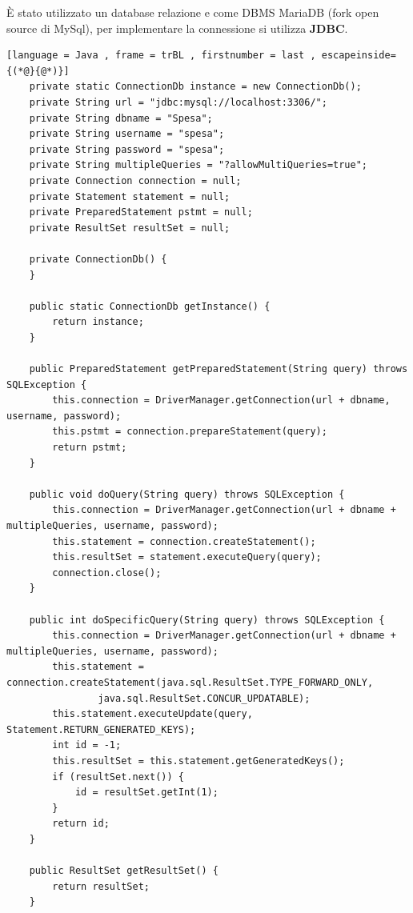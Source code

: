 \documentclass{article}
\begin{document}
\noindent \`E stato utilizzato un database relazione e come DBMS MariaDB (fork open source di MySql),
per implementare la connessione si utilizza \textbf{JDBC}.
\newpage
\begin{lstlisting}[language = Java , frame = trBL , firstnumber = last , escapeinside={(*@}{@*)}]
    private static ConnectionDb instance = new ConnectionDb();
    private String url = "jdbc:mysql://localhost:3306/";
    private String dbname = "Spesa";
    private String username = "spesa";
    private String password = "spesa";
    private String multipleQueries = "?allowMultiQueries=true";
    private Connection connection = null;
    private Statement statement = null;
    private PreparedStatement pstmt = null;
    private ResultSet resultSet = null;

    private ConnectionDb() {
    }

    public static ConnectionDb getInstance() {
        return instance;
    }

    public PreparedStatement getPreparedStatement(String query) throws SQLException {
        this.connection = DriverManager.getConnection(url + dbname, username, password);
        this.pstmt = connection.prepareStatement(query);
        return pstmt;
    }

    public void doQuery(String query) throws SQLException {
        this.connection = DriverManager.getConnection(url + dbname + multipleQueries, username, password);
        this.statement = connection.createStatement();
        this.resultSet = statement.executeQuery(query);
        connection.close();
    }

    public int doSpecificQuery(String query) throws SQLException {
        this.connection = DriverManager.getConnection(url + dbname + multipleQueries, username, password);
        this.statement = connection.createStatement(java.sql.ResultSet.TYPE_FORWARD_ONLY,
                java.sql.ResultSet.CONCUR_UPDATABLE);
        this.statement.executeUpdate(query, Statement.RETURN_GENERATED_KEYS);
        int id = -1;
        this.resultSet = this.statement.getGeneratedKeys();
        if (resultSet.next()) {
            id = resultSet.getInt(1);
        }
        return id;
    }

    public ResultSet getResultSet() {
        return resultSet;
    }
\end{lstlisting}
\end{document}
